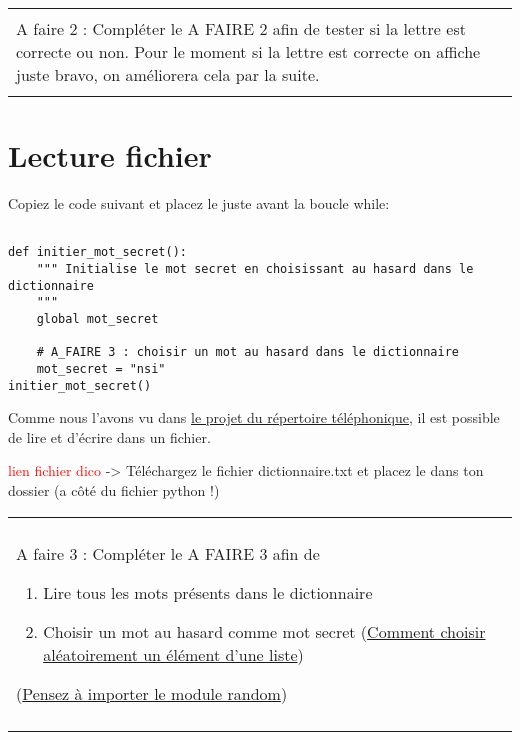 \documentclass[12pt]{article}
\newcommand\todo[1]{\textcolor{red}{#1}}
\newenvironment{exercice}
    {\begin{center}
    \begin{tabular}{|p{0.9\textwidth}|}
    \hline\\
    }
    {
    \\\\\hline
    \end{tabular}
    \end{center}
    }
\begin{document}
\begin{exercice}
\ding{46} A faire 2 : Compléter le A FAIRE 2 afin de tester si la lettre est correcte ou non. \newline
Pour le moment si la lettre est correcte on affiche juste bravo, on améliorera cela par la suite.
\end{exercice}

\section{Lecture fichier}
Copiez le code suivant et placez le juste avant la boucle while:
\begin{verbatim}

def initier_mot_secret():
    """ Initialise le mot secret en choisissant au hasard dans le dictionnaire
    """
    global mot_secret

    # A_FAIRE 3 : choisir un mot au hasard dans le dictionnaire
    mot_secret = "nsi"
initier_mot_secret()
\end{verbatim}
\newline
Comme nous l'avons vu dans \href{https://pixees.fr/informatiquelycee/n_site/nsi_prem_projet_1.html}{le projet du répertoire téléphonique}, il est possible de lire et d'écrire dans un fichier.


\todo{lien fichier dico}
-> Téléchargez le fichier dictionnaire.txt et placez le dans ton dossier (a côté du fichier python !)

\begin{exercice}
\ding{46} A faire 3 : Compléter le A FAIRE 3 afin de  \newline
\begin{enumerate}
    \item Lire tous les mots présents dans le dictionnaire
    \item Choisir un mot au hasard comme mot secret (\href{https://letmegooglethat.com/?q=python+choisir+hasard+liste}{Comment choisir aléatoirement un élément d'une liste})
\end{enumerate}

\newline
(\href{https://google.gprivate.com/search.php?search?q=importer+module+random}{Pensez à importer le module random})
\end{exercice}
\end{document}
